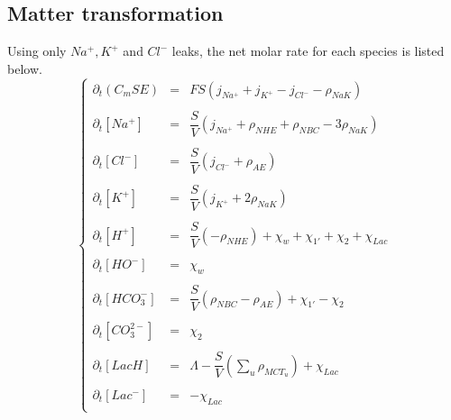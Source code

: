 \documentclass{revtex4}
\begin{document}
\subsection{Matter transformation}
Using only $Na^+,K^+$ and $Cl^-$ leaks, the net molar rate for each species is
listed below.	
\begin{equation}
\left\lbrace
\begin{array}{rcl}
	\partial_t \left(C_m S E \right) & = & FS\left(j_{Na^+}+j_{K^+}-j_{Cl^-} - \rho_{NaK}\right) \\
	\\
	\partial_t \left[Na^+\right] & = & \dfrac{S}{V}\left(j_{Na^+}+\rho_{NHE}+\rho_{NBC}-3\rho_{NaK}\right) \\
	\\
	\partial_t \left[Cl^-\right] & = & \dfrac{S}{V}\left(j_{Cl^-} + \rho_{AE}\right)\\
	\\
	\partial_t \left[K^+\right]  & = & \dfrac{S}{V}\left(j_{K^+}+2\rho_{NaK}\right)\\
	\\
	\partial_t \left[H^+\right]  & = & \dfrac{S}{V}\left(-\rho_{NHE}\right) + \chi_{w} + \chi_{1'} + \chi_2 + \chi_{Lac}\\
	\\
	\partial_t \left[HO^-\right] & = & \chi_{w}\\
	\\
	\partial_t \left[HCO_3^-\right] & = & \dfrac{S}{V}\left(\rho_{NBC}-\rho_{AE}\right) + \chi_{1'} - \chi_2 \\
	\\
	\partial_t \left[CO_3^{2-}\right] & = & \chi_2\\
	\\
	\partial_t \left[LacH\right]      & = & \Lambda - \dfrac{S}{V}\left(\sum_u\rho_{MCT_u}\right) + \chi_{Lac}\\
	\\
	\partial_t \left[Lac^-\right]     & = & - \chi_{Lac}\\
	
\end{array}
\right.
\end{equation}
\end{document}
